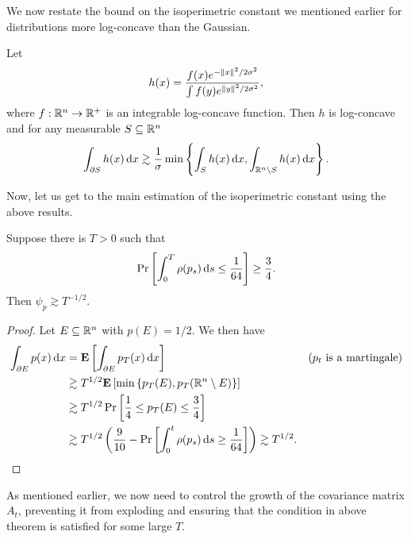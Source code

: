 		We now restate the bound on the isoperimetric constant we mentioned earlier for distributions more log-concave than the Gaussian.

		\begin{theorem}
			Let
			\[ h(x) = \frac{f(x)e^{-\left\lVert x\right\rVert^2/2\sigma^2}}{\int f(y)e^{\left\lVert y\right\rVert^2/2\sigma^2}}, \]
			where $f:\mathbb{R}^n\to\mathbb{R}^+$ is an integrable log-concave function. Then $h$ is log-concave and for any measurable $S\subseteq\mathbb{R}^n$
			\[ \int_{\partial S} h(x)\operatorname{d}\!{x} \gtrsim \frac{1}{\sigma} \min\left\{\int_S h(x)\operatorname{d}\!{x}, \int_{\mathbb{R}^n\setminus S}h(x)\operatorname{d}\!{x}\right\}. \]
		\end{theorem}

		Now, let us get to the main estimation of the isoperimetric constant using the above results.
		\begin{theorem}
			Suppose there is $T > 0$ such that
			\[ \Pr\left[\int_0^T \rho(p_s) \operatorname{d}\!{s} \leq \frac{1}{64} \right] \geq \frac{3}{4}. \]
			Then $\psi_p \gtrsim T^{-1/2}$.
		\end{theorem}
		\begin{proof}
			Let $E\subseteq\mathbb{R}^n$ with $p(E) = 1/2$.
			We then have
			\begin{align*}
				\int_{\partial E} p(x) \operatorname{d}\!{x} &= \textbf{E}\left[ \int_{\partial E} p_T(x)\operatorname{d}\!{x} \right] & (p_t\text{ is a martingale}) \\
					&\gtrsim T^{1/2} \textbf{E} \left[ \min\left\{p_T(E) , p_T(\mathbb{R}^n\setminus E)\right\} \right] \\
					&\gtrsim T^{1/2} \Pr\left[ \frac{1}{4} \leq p_T(E) \leq \frac{3}{4} \right] \\
					&\gtrsim T^{1/2} \left(\frac{9}{10} - \Pr\left[\int_0^t \rho(p_s)\operatorname{d}\!{s} \geq \frac{1}{64}\right]\right) \gtrsim T^{1/2}.
			\end{align*}
		\end{proof}

		As mentioned earlier, we now need to control the growth of the covariance matrix $A_t$, preventing it from exploding and ensuring that the condition in above theorem is satisfied for some large $T$.